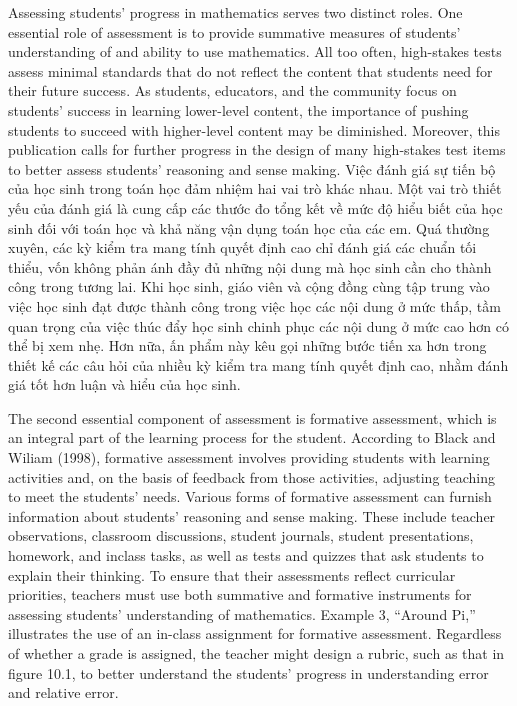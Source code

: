 \documentclass[
  10pt,
  a4paper,
  landscape,
  twoside,
  openany
]{scrbook}
\newcommand{\EN}[1]{#1}
\newcommand{\VI}[1]{#1}
\newcommand{\NOTE}[1]{#1}
\begin{document}
\TriPara
{
\EN{Assessing students' progress in mathematics serves two distinct roles. One essential role of assessment is to provide summative measures of students' understanding of and ability to use mathematics. All too often, high-stakes tests assess minimal standards that do not reflect the content that students need for their future success. As students, educators, and the community focus on students' success in learning lower-level content, the importance of pushing students to succeed with higher-level content may be diminished. Moreover, this publication calls for further progress in the design of many high-stakes test items to better assess students' reasoning and sense making.}
}
{
\VI{Việc đánh giá sự tiến bộ của học sinh trong toán học đảm nhiệm hai vai trò khác nhau. Một vai trò thiết yếu của đánh giá là cung cấp các thước đo tổng kết về mức độ hiểu biết của học sinh đối với toán học và khả năng vận dụng toán học của các em. Quá thường xuyên, các kỳ kiểm tra mang tính quyết định cao chỉ đánh giá các chuẩn tối thiểu, vốn không phản ánh đầy đủ những nội dung mà học sinh cần cho thành công trong tương lai. Khi học sinh, giáo viên và cộng đồng cùng tập trung vào việc học sinh đạt được thành công trong việc học các nội dung ở mức thấp, tầm quan trọng của việc thúc đẩy học sinh chinh phục các nội dung ở mức cao hơn có thể bị xem nhẹ. Hơn nữa, ấn phẩm này kêu gọi những bước tiến xa hơn trong thiết kế các câu hỏi của nhiều kỳ kiểm tra mang tính quyết định cao, nhằm đánh giá tốt hơn luận và hiểu của học sinh.}
}
{
\NOTE{}
}

\TriPara
{
\EN{The second essential component of assessment is formative assessment, which is an integral part of the learning process for the student. According to Black and Wiliam (1998), formative assessment involves providing students with learning activities and, on the basis of feedback from those activities, adjusting teaching to meet the students' needs. Various forms of formative assessment can furnish information about students' reasoning and sense making. These include teacher observations, classroom discussions, student journals, student presentations, homework, and inclass tasks, as well as tests and quizzes that ask students to explain their thinking. To ensure that their assessments reflect curricular priorities, teachers must use both summative and formative instruments for assessing students' understanding of mathematics. Example 3, “Around Pi,” illustrates the use of an in-class assignment for formative assessment. Regardless of whether a grade is assigned, the teacher might design a rubric, such as that in figure 10.1, to better understand the students' progress in understanding error and relative error.}
}
{
\VI{}
}
{
\NOTE{}
}
\end{document}
